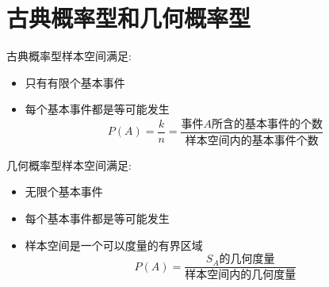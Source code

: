 \section{古典概率型和几何概率型}
\begin{definition}[古典概率型]
	古典概率型样本空间满足: 
	\begin{itemize}
		\item $\text{只有有限个基本事件}$
		\item $\text{每个基本事件都是等可能发生}$
		$$P(A)=\dfrac{k}{n}=\dfrac{\text{事件}A\text{所含的基本事件的个数}}{\text{样本空间内的基本事件个数}}$$
	\end{itemize}
\end{definition}
\begin{definition}[几何概率型]
	几何概率型样本空间满足: 
	\begin{itemize}
		\item $\text{无限个基本事件}$
		\item $\text{每个基本事件都是等可能发生}$
		\item $\text{样本空间是一个可以度量的有界区域}$
		$$P(A)=\dfrac{S_{A}\text{的几何度量}}{\text{样本空间内的几何度量}}$$
	\end{itemize}
\end{definition}

